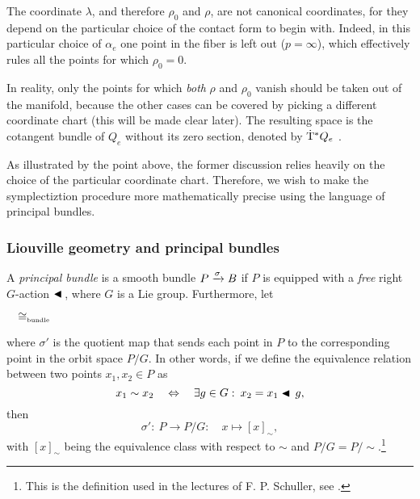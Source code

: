 The coordinate $\lambda$, and therefore $\rho_0$ and $\rho$, are not canonical coordinates, for they depend on the particular choice of the contact form to begin with. Indeed, in this particular choice of $\alpha_e$ one point in the fiber is left out ($p = \infty$), which effectively rules all the points for which $\rho_0 = 0$. 

In reality, only the points for which \emph{both} $\rho$ and $\rho_0$ vanish should be taken out of the manifold, because the other cases can be covered by picking a different coordinate chart (this will be made clear later). The resulting space is the cotangent bundle of $Q_e$ without its zero section, denoted by $ \mathrm{\dot{T}}^*Q_e$ \cite{VanderSchaft2021a,Libermann1987}.

As illustrated by the point above, the former discussion relies heavily on the choice of the particular coordinate chart. Therefore, we wish to make the symplectiztion procedure more mathematically precise using the language of principal bundles.

\subsubsection{Liouville geometry and principal bundles}
A \emph{principal bundle} is a smooth bundle $P\xrightarrow[]{\sigma}B$ if $P$ is equipped with a \emph{free} right $G$-action $\blacktriangleleft\,$, where $G$ is a Lie group. Furthermore, let  
\begin{center}
    $\quad \cong_\text{\tiny bundle} \quad $
\end{center}
where $\sigma'$ is the quotient map that sends each point in $P$ to the corresponding point in the orbit space $P/G$. In other words, if we define the equivalence relation between two points $x_1, x_2 \in P$ as
$$ x_1 \sim x_2 \quad \Leftrightarrow \quad \exists g \in G:\: x_2 = x_1 \blacktriangleleft\,g,$$
then 
$$ \sigma':\: P \to P/G:\quad x \mapsto [x]_\sim, $$
with $[x]_\sim$ being the equivalence class with respect to $\sim$ and $P/G = P/\sim$.\footnote{This is the definition used in the lectures of F. P. Schuller, see \cite{Schuller2014}.}

